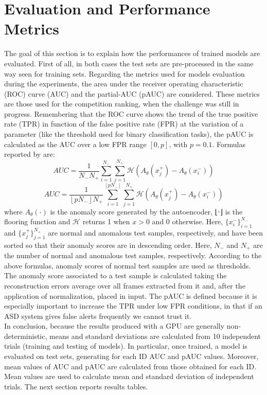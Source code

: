 \section{Evaluation and Performance Metrics}
The goal of this section is to explain how the performances of trained models are evaluated. First of all, in both cases the test sets are pre-processed in the same way seen for training sets. Regarding the metrics used for models evaluation during the experiments, the area under the receiver operating characteristic (ROC) curve (AUC) and the partial-AUC (pAUC) are considered. These metrics are those used for the competition ranking, when the challenge was still in progress. Remembering that the ROC curve shows the trend of the true positive rate (TPR) in function of the false positive rate (FPR) at the variation of a parameter (like the threshold used for binary classification tasks), the pAUC is calculated as the AUC over a low FPR range $[0,p]$, with $p=0.1$. Formulas reported by \cite{DCASE} are:
\[ AUC =\frac{1}{N_-N_+}\sum_{i=1}^{N_-}\sum_{j=1}^{N_+}\mathcal{H}(A_\theta(x_j^+)-A_\theta(x_i^-)) \]
\[AUC =\frac{1}{ \left \lfloor pN_- \right \rfloor N_+}\sum_{i=1}^{ \left \lfloor pN_- \right \rfloor }\sum_{j=1}^{N_+}\mathcal{H}(A_\theta(x_j^+)-A_\theta(x_i^-))\]
where $A_\theta(\cdot)$ is the anomaly score generated by the autoencoder, ⌊⋅⌋ is the flooring function and $\mathcal{H}$ returns 1 when $x>0$ and $0$ otherwise. Here, $\{x^−_i\}^{N_-}_{i=1}$
and $\{x^+_j\}^{N_+}_{j=1}$ are normal and anomalous test samples, respectively, and have been sorted so that their anomaly scores are in descending order. Here, $N_−$ and $N_+$
are the number of normal and anomalous test samples, respectively. According to the above formulas, anomaly scores of normal test samples are used as thresholds. The anomaly score associated to a test sample is calculated taking the reconstruction errors average over all frames extracted from it and, after the application of normalization, placed in input. The pAUC is defined because it is especially important to increase the TPR under low FPR conditions, in that if an ASD system gives false alerts frequently we cannot trust it. \\
In conclusion, because the results produced with a GPU are generally non-deterministic, means and standard deviations are calculated from 10 independent trials (training and testing of models). In particular, once trained, a model is evaluated on test sets, generating for each ID AUC and pAUC values. Moreover, mean values of AUC and pAUC are calculated from those obtained for each ID. Mean values are used to calculate mean and standard deviation of independent trials. The next section reports results tables.
